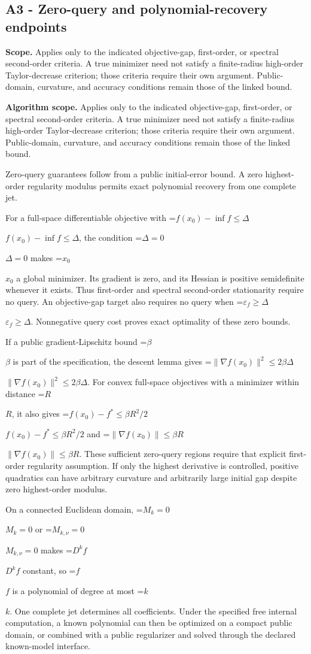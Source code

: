 \documentclass[10pt,a4paper]{article}
\newcommand{\AtlasMath}[1]{\par\begingroup\centering\setbox0=\hbox{$\displaystyle #1$}\ifdim\wd0>1.4\linewidth\typeout{ATLAS WIDE FORMULA: \the\wd0}\fi\ifdim\wd0>\linewidth\resizebox{\linewidth}{!}{\box0}\else\box0\fi\par\endgroup}
\newcommand{\AtlasInlineMath}[1]{\begingroup\setbox0=\hbox{$#1$}\ifdim\wd0>.4\linewidth\endgroup\AtlasMath{#1}\else\endgroup$#1$\fi}
\begin{document}
\subsection{A3 - Zero-query and polynomial-recovery endpoints}
\textbf{Scope.} Applies only to the indicated objective-gap, first-order, or spectral second-order criteria. A true minimizer need not satisfy a finite-radius high-order Taylor-decrease criterion; those criteria require their own argument. Public-domain, curvature, and accuracy conditions remain those of the linked bound.

\textbf{Algorithm scope.} Applies only to the indicated objective-gap, first-order, or spectral second-order criteria. A true minimizer need not satisfy a finite-radius high-order Taylor-decrease criterion; those criteria require their own argument. Public-domain, curvature, and accuracy conditions remain those of the linked bound.

Zero-query guarantees follow from a public initial-error bound. A zero highest-order regularity modulus permits exact polynomial recovery from one complete jet.

For a full-space differentiable objective with \AtlasInlineMath{f(x_0)-\inf f\le\Delta}, the condition \AtlasInlineMath{\Delta=0} makes \AtlasInlineMath{x_0} a global minimizer. Its gradient is zero, and its Hessian is positive semidefinite whenever it exists. Thus first-order and spectral second-order stationarity require no query. An objective-gap target also requires no query when \AtlasInlineMath{\varepsilon_f\ge\Delta}. Nonnegative query cost proves exact optimality of these zero bounds.

If a public gradient-Lipschitz bound \AtlasInlineMath{\beta} is part of the specification, the descent lemma gives \AtlasInlineMath{\|\nabla f(x_0)\|^2\le2\beta\Delta}. For convex full-space objectives with a minimizer within distance \AtlasInlineMath{R}, it also gives \AtlasInlineMath{f(x_0)-f^*\le\beta R^2/2} and \AtlasInlineMath{\|\nabla f(x_0)\|\le\beta R}. These sufficient zero-query regions require that explicit first-order regularity assumption. If only the highest derivative is controlled, positive quadratics can have arbitrary curvature and arbitrarily large initial gap despite zero highest-order modulus.

On a connected Euclidean domain, \AtlasInlineMath{M_k=0} or \AtlasInlineMath{M_{k,\nu}=0} makes \AtlasInlineMath{D^kf} constant, so \AtlasInlineMath{f} is a polynomial of degree at most \AtlasInlineMath{k}. One complete jet determines all coefficients. Under the specified free internal computation, a known polynomial can then be optimized on a compact public domain, or combined with a public regularizer and solved through the declared known-model interface.
\end{document}
